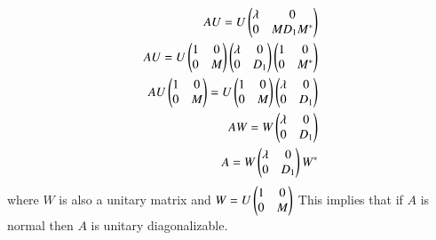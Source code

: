 \documentclass[journal,12pt,twocolumn]{IEEEtran}
\renewcommand\thesection{\arabic{section}}
\begin{document}
\begin{align}
AU = U \begin{pmatrix}\lambda & 0\\0 & M D_1 M^*\end{pmatrix}\\
AU = U \begin{pmatrix}1 & 0\\0 & M\end{pmatrix}\begin{pmatrix}\lambda & 0\\0 & D_1\end{pmatrix}\begin{pmatrix}1 & 0\\0 & M^*\end{pmatrix}\\
AU\begin{pmatrix}1 & 0\\0 & M\end{pmatrix} = U \begin{pmatrix}1 & 0\\0 & M\end{pmatrix}\begin{pmatrix}\lambda & 0\\0 & D_1\end{pmatrix}\\
AW = W\begin{pmatrix}\lambda & 0\\0 & D_1\end{pmatrix}\\
A = W\begin{pmatrix}\lambda & 0\\0 & D_1\end{pmatrix}W^*
\end{align}
where $W$ is also a unitary matrix and $W=U\begin{pmatrix}1 & 0\\0 & M\end{pmatrix}$
This implies that if $A$ is normal then $A$ is unitary diagonalizable.
%
\end{document}
